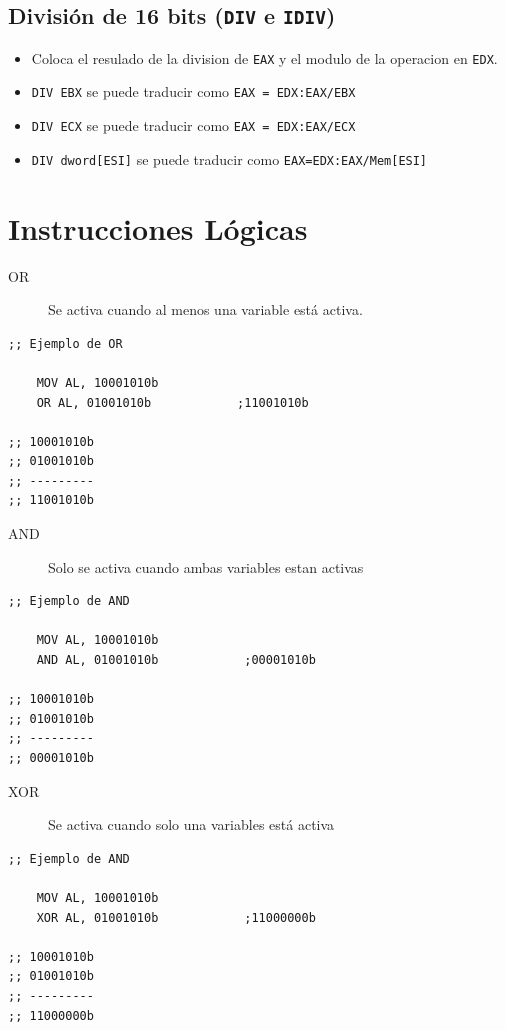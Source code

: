 \documentclass[12pt]{article}
\begin{document}
\subsection*{División de 16 bits (\texttt{DIV} e \texttt{IDIV})}
\label{sec:orgcb111ac}
\begin{itemize}
\item Coloca el resulado de la division de \texttt{EAX} y el modulo de la operacion en \texttt{EDX}.
\item \texttt{DIV EBX} se puede traducir como \texttt{EAX = EDX:EAX/EBX}
\item \texttt{DIV ECX} se puede traducir como \texttt{EAX = EDX:EAX/ECX}
\item \texttt{DIV dword[ESI]} se puede traducir como \texttt{EAX=EDX:EAX/Mem[ESI]}
\end{itemize}

\pagebreak

\section*{Instrucciones Lógicas}
\label{sec:org256d8b2}
\begin{description}
\item[{OR}] Se activa cuando al menos una variable está activa.
\end{description}
\lstset{language=nasm,label= ,caption= ,captionpos=b,numbers=none,style=mystyle}
\begin{lstlisting}
;; Ejemplo de OR

    MOV AL, 10001010b
    OR AL, 01001010b            ;11001010b

;; 10001010b
;; 01001010b  
;; ---------
;; 11001010b

\end{lstlisting}
\begin{description}
\item[{AND}] Solo se activa cuando ambas variables estan activas
\end{description}
\lstset{language=nasm,label= ,caption= ,captionpos=b,numbers=none,style=mystyle}
\begin{lstlisting}
;; Ejemplo de AND

    MOV AL, 10001010b
    AND AL, 01001010b            ;00001010b

;; 10001010b
;; 01001010b  
;; ---------
;; 00001010b

\end{lstlisting}
\begin{description}
\item[{XOR}] Se activa cuando solo una variables está activa
\end{description}
\lstset{language=nasm,label= ,caption= ,captionpos=b,numbers=none,style=mystyle}
\begin{lstlisting}
;; Ejemplo de AND

    MOV AL, 10001010b
    XOR AL, 01001010b            ;11000000b

;; 10001010b
;; 01001010b  
;; ---------
;; 11000000b

\end{lstlisting}
\end{document}
